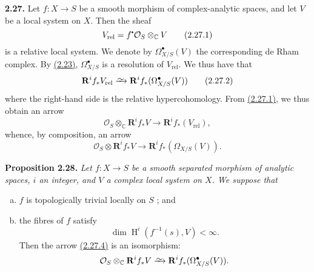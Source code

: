 \documentclass{report}
\newenvironment{itenv}[1]
  {\phantomsection\par\medskip\noindent\textbf{#1.}\itshape}
  {\par\medskip}
\newenvironment{rmenv}[1]
  {\phantomsection\par\medskip\noindent\textbf{#1.}\rmfamily}
  {\par\medskip}
\renewcommand{\cal}[1]{{\mathcal{#1}}}
\newcommand{\sbullet}{{\mathbin{\vcenter{\hbox{\scalebox{.5}{$\bullet$}}}}}}
\newcommand{\CC}{\mathbb{C}}
\newcommand{\RR}{\mathbf{R}}
\newcommand{\simto}{\xrightarrow{\raisebox{-0.7ex}[0ex][0ex]{$\sim$}}}
\DeclareMathOperator{\HH}{H}
\newcommand{\oldpage}[1]{\marginpar{\footnotesize$\Big\vert$ \textit{p.~#1}}}
\begin{document}
\begin{rmenv}{2.27}
\label{I.2.27}
  Let $f\colon X\to S$ be a smooth morphism of complex-analytic spaces, and let $V$ be a local system on $X$.
  Then the sheaf
\oldpage{20}
  \[
  \label{I.2.27.1}
    V_\mathrm{rel} = f^\sbullet\cal{O}_S \otimes_\CC V
  \tag{2.27.1}
  \]
  is a relative local system.
  We denote by $\Omega_{X/S}^\bullet(V)$ the corresponding de Rham complex.
  By \hyperref[I.2.23]{(2.23)}, $\Omega_{X/S}^\bullet$ is a resolution of $V_\mathrm{rel}$.
  We thus have that
  \[
  \label{I.2.27.2}
    \RR^i f_* V_\mathrm{rel} \simto \RR^i f_*(\Omega_{X/S}^\bullet(V))
  \tag{2.27.2}
  \]
  where the right-hand side is the relative hypercohomology.
  From \hyperref[I.2.27.1]{(2.27.1)}, we thus obtain an arrow
  \[
  \label{I.2.27.3}
    \cal{O}_S \otimes_\CC \RR^i f_*V \to \RR^i f_*(V_\mathrm{rel}),
  \tag{2.27.3}
  \]
  whence, by composition, an arrow
  \[
  \label{I.2.27.4}
    \cal{O}_S \otimes \RR^i f_*V \to \RR^i f_*(\Omega_{X/S}(V)).
  \tag{2.27.4}
  \]
\end{rmenv}

\begin{itenv}{Proposition 2.28}
\label{I.2.28}
  Let $f\colon X\to S$ be a smooth separated morphism of analytic spaces, $i$ an integer, and $V$ a complex local system on $X$.
  We suppose that
  \begin{enumerate}[a)]
    \item $f$ is topologically trivial locally on $S$ ; and
    \item the fibres of $f$ satisfy
      \[
        \dim\HH^i(f^{-1}(s),V) < \infty.
      \]
      Then the arrow \hyperref[I.2.27.4]{(2.27.4)} is an isomorphism:
      \[
        \cal{O}_S \otimes_\CC \RR^i f_*V \simto \RR^i f_*(\Omega_{X/S}^\bullet(V)).
      \]
  \end{enumerate}
\end{itenv}
\end{document}
